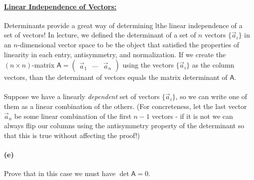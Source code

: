 \documentclass{article}
\begin{document}
\phline
\paragraph{\ul{Linear Independence of Vectors:}}
Determinants provide a great way of determining lthe linear independence of a set of vectors!
In lecture, we defined the determinant of a set of $n$ vectors $\{\vec{a}_{i}\}$ in an $n$-dimensional vector space to be the object that satisfied the properties of 
linearity in each entry, antisymmetry, and normalization.  If we create the $(n\times n)$-matrix $\mathsf{A}=\begin{pmatrix}\vec{a}_{1}&\cdots&\vec{a}_{n}\end{pmatrix}$
using the vectors $\{\vec{a}_{i}\}$ as the column vectors, than the determinant of vectors equals the matrix determinant of $\mathsf{A}$.

\paragraph{}
Suppose we have a linearly \emph{dependent} set of vectors $\{\vec{a}_{i}\}$, so we can write one of them as a linear combination
of the others.  (For concreteness, let the last vector $\vec{a}_{n}$ be some linear combination of the first $n-1$ vectors - if it is not we can always flip our columns 
using the antisymmetry property of the determinant so that this is true without affecting the proof!)

\paragraph{(e)}
Prove that in this case we must have $\det \mathsf{A} = 0$.
\end{document}
